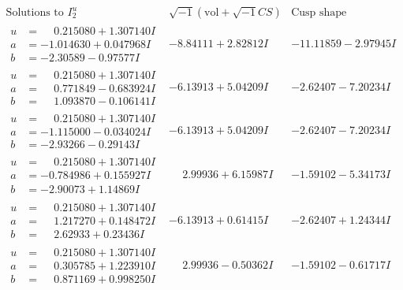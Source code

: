 \documentclass[1p]{elsarticle_modified}
\theoremstyle{definition}
\newcommand{\I}{\sqrt{-1}}
\begin{document}
$$\begin{array}{c|c|c}  
\text{Solutions to }I^u_{2}& \I (\text{vol} + \sqrt{-1}CS) & \text{Cusp shape}\\
 \hline 
\begin{aligned}
u &= \phantom{-}0.215080 + 1.307140 I \\
a &= -1.014630 + 0.047968 I \\
b &= -2.30589 - 0.97577 I\end{aligned}
 & -8.84111 + 2.82812 I & -11.11859 - 2.97945 I \\ \hline\begin{aligned}
u &= \phantom{-}0.215080 + 1.307140 I \\
a &= \phantom{-}0.771849 - 0.683924 I \\
b &= \phantom{-}1.093870 - 0.106141 I\end{aligned}
 & -6.13913 + 5.04209 I & -2.62407 - 7.20234 I \\ \hline\begin{aligned}
u &= \phantom{-}0.215080 + 1.307140 I \\
a &= -1.115000 - 0.034024 I \\
b &= -2.93266 - 0.29143 I\end{aligned}
 & -6.13913 + 5.04209 I & -2.62407 - 7.20234 I \\ \hline\begin{aligned}
u &= \phantom{-}0.215080 + 1.307140 I \\
a &= -0.784986 + 0.155927 I \\
b &= -2.90073 + 1.14869 I\end{aligned}
 & \phantom{-}2.99936 + 6.15987 I & -1.59102 - 5.34173 I \\ \hline\begin{aligned}
u &= \phantom{-}0.215080 + 1.307140 I \\
a &= \phantom{-}1.217270 + 0.148472 I \\
b &= \phantom{-}2.62933 + 0.23436 I\end{aligned}
 & -6.13913 + 0.61415 I & -2.62407 + 1.24344 I \\ \hline\begin{aligned}
u &= \phantom{-}0.215080 + 1.307140 I \\
a &= \phantom{-}0.305785 + 1.223910 I \\
b &= \phantom{-}0.871169 + 0.998250 I\end{aligned}
 & \phantom{-}2.99936 - 0.50362 I & -1.59102 - 0.61717 I \\ \hline\begin{aligned}

\end{aligned}
\end{array}$$
\end{document}
